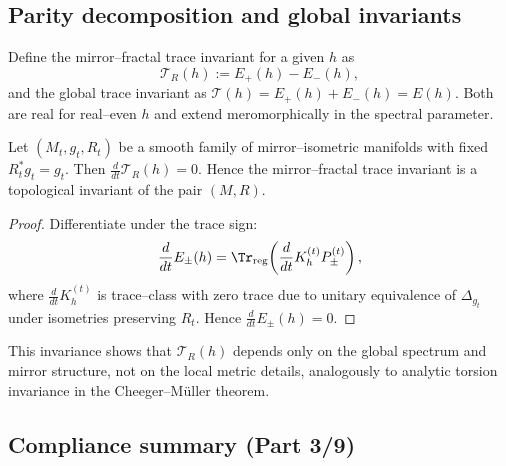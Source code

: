 \subsection{Parity decomposition and global invariants}
\label{subsec:ch6-part3-parity-invariants} \relax

\begin{definition}
\label{def:global-inv}
Define the mirror–fractal trace invariant for a given $h$ as
\[
\mathcal{T}_R(h)
:=E_+(h)-E_-(h),
\]
and the global trace invariant as $\mathcal{T}(h)=E_+(h)+E_-(h)=E(h)$.  
Both are real for real–even $h$ and extend meromorphically in the spectral parameter. %
\end{definition}

\begin{proposition}
\label{prop:invariance}
Let $(M_t,g_t,R_t)$ be a smooth family of mirror–isometric manifolds with fixed $R_t^*g_t=g_t$.  
Then $\frac{d}{dt}\mathcal{T}_R(h)=0$.  
Hence the mirror–fractal trace invariant is a topological invariant of the pair $(M,R)$. %
\end{proposition}

\begin{proof}
Differentiate under the trace sign:
\[
\frac{d}{dt}E_\pm(h)
=\Tr_{\mathrm{reg}}\!\left(\frac{d}{dt}K_h^{(t)} P_\pm^{(t)}\right),
\]
where $\frac{d}{dt}K_h^{(t)}$ is trace–class with zero trace due to unitary equivalence of $\Delta_{g_t}$ under isometries preserving $R_t$.  
Hence $\frac{d}{dt}E_\pm(h)=0$. %
\end{proof}

\begin{remark}
\label{rem:topo}
This invariance shows that $\mathcal{T}_R(h)$ depends only on the global spectrum and mirror structure, not on the local metric details, analogously to analytic torsion invariance in the Cheeger–Müller theorem. %
\end{remark}

\subsection{Compliance summary (Part 3/9)}
\label{subsec:ch6-part3-compliance} \relax

